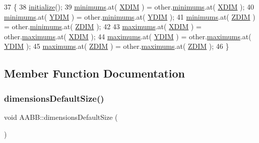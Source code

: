 \begin{DoxyCode}
37 \{
38     \hyperlink{class_a_a_b_b_aa2a1a47dc45291be16276dd397bc78fe}{initialize}();
39     \hyperlink{class_a_a_b_b_aaf1ec35e5c0258cd57e65429f93c14a2}{minimums}.at( \hyperlink{class_a_a_b_b_aac753e0248d039329b25b38d0ed9cd4f}{XDIM} ) = other.\hyperlink{class_a_a_b_b_aaf1ec35e5c0258cd57e65429f93c14a2}{minimums}.at( \hyperlink{class_a_a_b_b_aac753e0248d039329b25b38d0ed9cd4f}{XDIM} );
40     \hyperlink{class_a_a_b_b_aaf1ec35e5c0258cd57e65429f93c14a2}{minimums}.at( \hyperlink{class_a_a_b_b_a5192e3bdf0789cdc9e5f643b401e5b10}{YDIM} ) = other.\hyperlink{class_a_a_b_b_aaf1ec35e5c0258cd57e65429f93c14a2}{minimums}.at( \hyperlink{class_a_a_b_b_a5192e3bdf0789cdc9e5f643b401e5b10}{YDIM} );
41     \hyperlink{class_a_a_b_b_aaf1ec35e5c0258cd57e65429f93c14a2}{minimums}.at( \hyperlink{class_a_a_b_b_a3e78cd8baa6ab6199afb2cb014e0db62}{ZDIM} ) = other.\hyperlink{class_a_a_b_b_aaf1ec35e5c0258cd57e65429f93c14a2}{minimums}.at( \hyperlink{class_a_a_b_b_a3e78cd8baa6ab6199afb2cb014e0db62}{ZDIM} );
42 
43     \hyperlink{class_a_a_b_b_a1289c3a2e5c7a98f90d5bcdb8251a06f}{maximums}.at( \hyperlink{class_a_a_b_b_aac753e0248d039329b25b38d0ed9cd4f}{XDIM} ) = other.\hyperlink{class_a_a_b_b_a1289c3a2e5c7a98f90d5bcdb8251a06f}{maximums}.at( \hyperlink{class_a_a_b_b_aac753e0248d039329b25b38d0ed9cd4f}{XDIM} );
44     \hyperlink{class_a_a_b_b_a1289c3a2e5c7a98f90d5bcdb8251a06f}{maximums}.at( \hyperlink{class_a_a_b_b_a5192e3bdf0789cdc9e5f643b401e5b10}{YDIM} ) = other.\hyperlink{class_a_a_b_b_a1289c3a2e5c7a98f90d5bcdb8251a06f}{maximums}.at( \hyperlink{class_a_a_b_b_a5192e3bdf0789cdc9e5f643b401e5b10}{YDIM} );
45     \hyperlink{class_a_a_b_b_a1289c3a2e5c7a98f90d5bcdb8251a06f}{maximums}.at( \hyperlink{class_a_a_b_b_a3e78cd8baa6ab6199afb2cb014e0db62}{ZDIM} ) = other.\hyperlink{class_a_a_b_b_a1289c3a2e5c7a98f90d5bcdb8251a06f}{maximums}.at( \hyperlink{class_a_a_b_b_a3e78cd8baa6ab6199afb2cb014e0db62}{ZDIM} );
46 \}
\end{DoxyCode}


\subsection{Member Function Documentation}
\mbox{\label{class_a_a_b_b_a7b7d51fd225c32d5a4d2723b1d9e503b}} 
\subsubsection{\texorpdfstring{dimensions\+Default\+Size()}{dimensionsDefaultSize()}}
{\footnotesize\ttfamily void A\+A\+B\+B\+::dimensions\+Default\+Size (\begin{DoxyParamCaption}{ }\end{DoxyParamCaption})\hspace{0.3cm}{\ttfamily [private]}}



